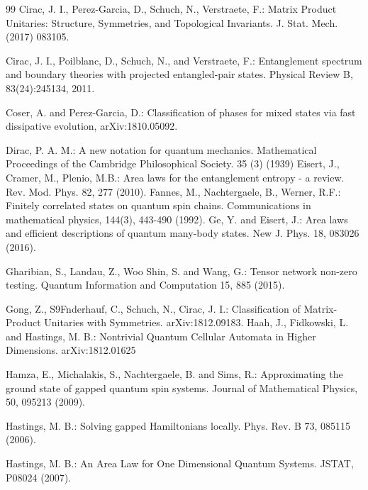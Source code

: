 \documentclass[smallextended]{svjour3}
\renewcommand{\1}{\mathbbm{1}}
\begin{document}
\begin{thebibliography}{99}
     Cirac,  J. I., Perez-Garcia, D.,  Schuch, N.,  Verstraete, F.: Matrix Product Unitaries: Structure, Symmetries, and Topological Invariants.  J. Stat. Mech. (2017) 083105.

     Cirac,  J. I.,  Poilblanc, D.,  Schuch, N., and  Verstraete, F.: Entanglement spectrum
    and boundary theories with projected entangled-pair states. Physical Review B, 83(24):245134,
    2011.

     Coser, A. and Perez-Garcia, D.: Classification of phases for mixed states via fast dissipative evolution, arXiv:1810.05092.

      Dirac, P. A. M.: A new notation for quantum mechanics. Mathematical Proceedings of the Cambridge Philosophical Society. 35 (3) (1939)
      Eisert, J.,  Cramer, M.,  Plenio, M.B.: Area laws for the entanglement entropy - a review. Rev. Mod. Phys. 82, 277 (2010).
      Fannes, M., Nachtergaele, B., Werner, R.F.: Finitely correlated states on quantum spin chains. Communications in mathematical physics, 144(3), 443-490 (1992).
     Ge, Y. and Eisert, J.: Area laws and efficient descriptions of quantum many-body states. New J. Phys. 18, 083026 (2016).


     Gharibian, S., Landau,  Z.,  Woo Shin, S. and Wang, G.: Tensor network non-zero testing. Quantum Information and Computation 15, 885 (2015).

     Gong, Z., S\x9Fnderhauf, C.,  Schuch, N.,  Cirac, J. I.: Classification of Matrix-Product Unitaries with Symmetries. arXiv:1812.09183.
     Haah, J.,  Fidkowski, L. and Hastings, M. B.: Nontrivial Quantum Cellular Automata in Higher Dimensions. arXiv:1812.01625


     Hamza, E., Michalakis, S., Nachtergaele, B. and  Sims, R.: Approximating the ground state of gapped quantum spin systems. Journal of Mathematical Physics, 50, 095213 (2009).




     Hastings, M. B.: Solving gapped Hamiltonians locally. Phys. Rev. B 73, 085115 (2006).


     Hastings, M. B.: An Area Law for One Dimensional Quantum Systems. JSTAT, P08024 (2007).


\end{thebibliography}
\end{document}
